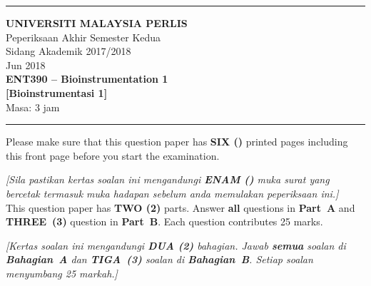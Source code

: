 \documentclass[12pt]{article}
\newcounter{counterquestion}
\newcommand{\translation}[1]{
	\fontsize{10pt}{\baselineskip}
		\emph{#1}
}
\begin{document}

	\pagestyle{titlestyle}
	\vspace*{5\baselineskip}
	\hrule \vspace*{2\baselineskip}
	\begin{center}
		\textbf{UNIVERSITI MALAYSIA PERLIS}\\[\baselineskip]
		Peperiksaan Akhir Semester Kedua
\\
		Sidang Akademik 2017/2018
\\[2\baselineskip]
		Jun 2018 \\[\baselineskip]
		\textbf{ENT390 -- Bioinstrumentation 1 }\\
		\textbf{[Bioinstrumentasi 1]} \\[2\baselineskip]
		Masa: 3 jam \\[2\baselineskip]
		\hrule \vspace*{2\baselineskip}
	\end{center}
	
	Please make sure that this question paper has \textbf{SIX (\pageref{LastPage})} printed pages including this front page before you start the examination.
	
	\translation{%
		[Sila pastikan kertas soalan ini mengandungi \textbf{ENAM (\pageref{LastPage})} muka surat yang bercetak termasuk muka hadapan sebelum anda memulakan peperiksaan ini.]
	}\\

	This question paper has \textbf{TWO (2)} parts. Answer \textbf{all} questions in \mbox{\textbf{Part A}} and \mbox{\textbf{THREE (3)}} question in \mbox{\textbf{Part B}}. Each question contributes 25 marks. 
		
	\translation{%
		[Kertas soalan ini mengandungi \textbf{DUA (2)} bahagian. Jawab \textbf{semua} soalan di \mbox{\textbf{Bahagian A}} dan \mbox{\textbf{TIGA (3)}} soalan di \mbox{\textbf{Bahagian B}}. Setiap soalan menyumbang 25 markah.]
	}
	
	\clearpage
	

\pagestyle{main}
\vspace*{1mm}
\setcounter{page}{2}



\newcommand{\newpart}{	 	
	\stepcounter{counterpart}
	\setcounter{counterquestion}{0}
	\textbf{\Alph{counterpart}}
}
\end{document}

